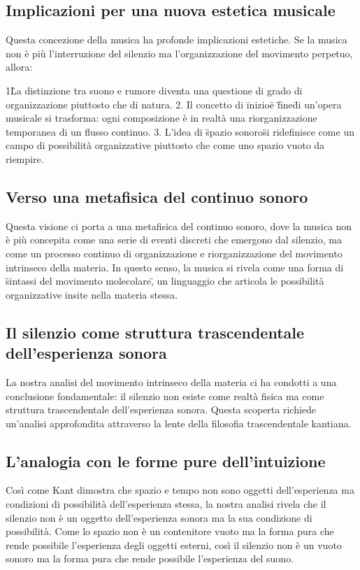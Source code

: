 \documentclass[a4paper,11pt]{article}
\begin{document}
\subsection{Implicazioni per una nuova estetica musicale}

Questa concezione della musica ha profonde implicazioni estetiche. Se la
musica non è più l'interruzione del silenzio ma l'organizzazione del
movimento perpetuo, allora:

1\. La distinzione tra suono e rumore diventa una questione di grado di
organizzazione piuttosto che di natura. 2. Il concetto di \"inizio\" e
\"fine\" di un'opera musicale si trasforma: ogni composizione è in
realtà una riorganizzazione temporanea di un flusso continuo. 3. L'idea
di \"spazio sonoro\" si ridefinisce come un campo di possibilità
organizzative piuttosto che come uno spazio vuoto da riempire.

\subsection{Verso una metafisica del continuo sonoro}

Questa visione ci porta a una metafisica del continuo sonoro, dove la
musica non è più concepita come una serie di eventi discreti che
emergono dal silenzio, ma come un processo continuo di organizzazione e
riorganizzazione del movimento intrinseco della materia. In questo
senso, la musica si rivela come una forma di \"sintassi del movimento
molecolare\", un linguaggio che articola le possibilità organizzative
insite nella materia stessa.

\subsection{Il silenzio come struttura trascendentale dell'esperienza sonora}

La nostra analisi del movimento intrinseco della materia ci ha condotti
a una conclusione fondamentale: il silenzio non esiste come realtà
fisica ma come struttura trascendentale dell'esperienza sonora. Questa
scoperta richiede un'analisi approfondita attraverso la lente della
filosofia trascendentale kantiana.

\subsection{L'analogia con le forme pure dell'intuizione}

Così come Kant dimostra che spazio e tempo non sono oggetti
dell'esperienza ma condizioni di possibilità dell'esperienza stessa, la
nostra analisi rivela che il silenzio non è un oggetto dell'esperienza
sonora ma la sua condizione di possibilità. Come lo spazio non è un
contenitore vuoto ma la forma pura che rende possibile l'esperienza
degli oggetti esterni, così il silenzio non è un vuoto sonoro ma la
forma pura che rende possibile l'esperienza del suono.
\end{document}
